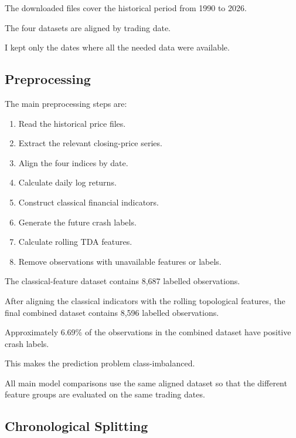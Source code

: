 \documentclass[oneside,english,11pt]{article}
\begin{document}
The downloaded files cover the historical
period from 1990 to 2026.

The four datasets are aligned by trading date.

I kept only the dates where all the needed data were available.

\subsection{Preprocessing}

The main preprocessing steps are:

\begin{enumerate}

\item Read the historical price files.

\item Extract the relevant closing-price series.

\item Align the four indices by date.

\item Calculate daily log returns.

\item Construct classical financial indicators.

\item Generate the future crash labels.

\item Calculate rolling TDA features.

\item Remove observations with unavailable features
or labels.

\end{enumerate}

The classical-feature dataset contains
8,687 labelled observations.

After aligning the classical indicators
with the rolling topological features,
the final combined dataset contains
8,596 labelled observations.

Approximately 6.69\% of the observations
in the combined dataset have positive
crash labels.

This makes the prediction problem
class-imbalanced.

All main model comparisons use the same
aligned dataset so that the different
feature groups are evaluated on the
same trading dates.

\subsection{Chronological Splitting}
\end{document}
